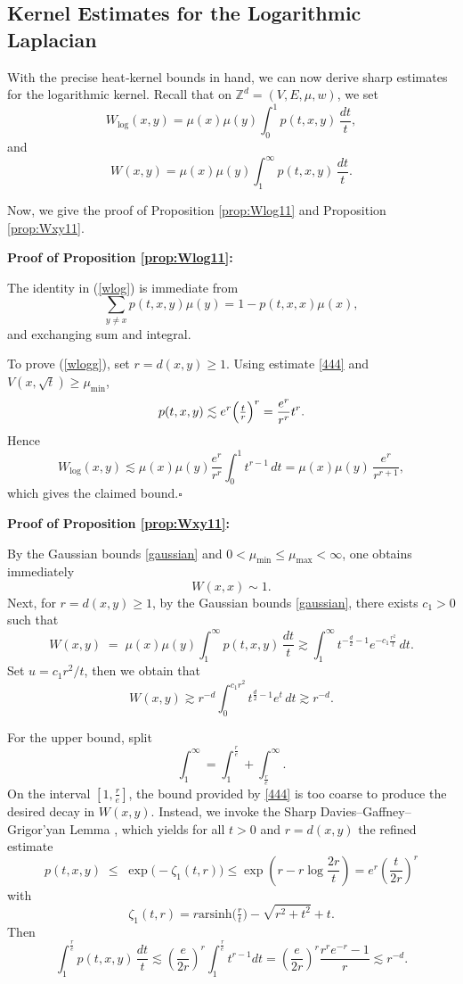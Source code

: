 \documentclass[reqno,12pt]{amsart}
\numberwithin{equation}{section}
\begin{document}
\subsection{Kernel Estimates for the Logarithmic Laplacian}

With the precise heat‐kernel bounds in hand, we can now derive sharp estimates for the logarithmic kernel.  Recall that on \(\mathbb{Z}^d=\left(V,E,\mu,w\right)\),  we set
\[
W_{\log}(x,y)
=\mu(x)\mu(y)\int_0^1 p(t,x,y)\,\frac{dt}{t},
\]
and
\[
W(x,y)
=\mu(x)\mu(y)\int_1^\infty p(t,x,y)\,\frac{dt}{t}.
\]


Now, we give the proof of Proposition \ref{prop:Wlog11} and Proposition \ref{prop:Wxy11}. 

	\vspace{1\baselineskip}
	
\noindent \textbf{Proof of Proposition \ref{prop:Wlog11}:}

	The identity in (\ref{wlog}) is immediate from
	\[
	\sum_{y\ne x}p(t,x,y)\mu(y)
	=1 - p(t,x,x)\mu(x),
	\]
	and exchanging sum and integral. 
	
	 To prove (\ref{wlogg}), set \(r=d(x,y)\ge1\).  Using estimate \eqref{444} and \(V(x,\sqrt t)\ge\mu_{\min}\), 
	\[
	p(t,x,y)\lesssim e^r\Bigl(\tfrac{t}{r}\Bigr)^r=\frac{e^r}{r^r}t^r.
	\]
	Hence
	\[
	W_{\log}(x,y)
	\lesssim \mu(x)\mu(y)\frac{e^r}{r^r}\int_0^1 t^{r-1}\,dt
	=\mu(x)\mu(y)\,\frac{e^r}{r^{r+1}},
	\]
	which gives the claimed bound.\hfill $\square$

	\vspace{1\baselineskip}

\noindent \textbf{Proof of Proposition \ref{prop:Wxy11}:}

	By the Gaussian bounds \eqref{gaussian} and $0<\mu_{\min}\le\mu_{\max}<\infty$, one obtains immediately	
	$$W(x,x)\sim 1.$$
	Next, for \(r=d(x,y)\ge1\), by the Gaussian bounds \eqref{gaussian}, there exists $c_1>0$ such that
	\[
	W(x,y)
	\;=\;\mu(x)\mu(y)\int_1^\infty p(t,x,y)\,\frac{dt}{t} \gtrsim \int_1^\infty t^{-\frac d2-1}
	e^{-c_1\frac{r^2}{t}}\,dt.
	\]
Set \(u=c_1r^2/t\), then we obtain that
		\[
	W(x,y) \gtrsim r^{-d}\int_0^{c_{1}r^2} t^{\frac d2-1}
	e^{t}\,dt\gtrsim r^{-d}.
	\]

	For the upper bound, split
	\[
	\int_1^\infty=\int_1^{\frac{r}{e}}+\int_{\frac{r}{e}}^\infty.
	\]
On the interval $[1,\frac{r}{e}]$, the bound provided by \eqref{444} is too coarse to produce the desired decay in $W(x,y)$.  Instead, we invoke the Sharp Davies–Gaffney–Grigor’yan Lemma \cite{bauer2017sharp}, which yields for all $t>0$ and $r=d(x,y)$ the refined estimate
$$
p(t,x,y)\;\le\;\exp\!\bigl(-\zeta_1(t,r)\bigr)\le \exp\left(r-r\log \frac{2r}{t}\right)=e^{r}\left(\frac{t}{2r}\right)^r
$$
with
$$
\zeta_1(t,r)
= r \mathrm{arsinh}\!\bigl(\tfrac{r}{t}\bigr)
- \sqrt{r^2 + t^2} + t.
$$
Then 
\[
\int_1^{\frac{r}{e}} p(t,x,y)\,\frac{dt}{t}\lesssim \left(\frac{e}{2r}\right)^{r}\int_1^{\frac{r}{e}} t^{r-1}dt=\left(\frac{e}{2r}\right)^{r}\frac{r^re^{-r}-1}{r}\lesssim r^{-d}.
\]
\end{document}
